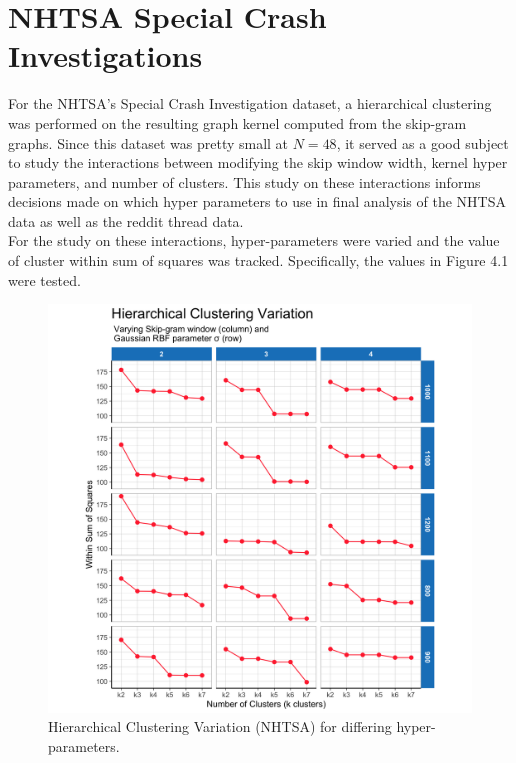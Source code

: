 %
%
%




\section{NHTSA Special Crash Investigations}
 For the NHTSA's Special Crash Investigation dataset, a hierarchical clustering was performed on the resulting graph kernel computed from the skip-gram graphs. Since this dataset was pretty small at $N=48$, it served as a good subject to study the interactions between modifying the skip window width, kernel hyper parameters, and number of clusters. This study on these interactions informs decisions made on which hyper parameters to use in final analysis of the NHTSA data as well as the reddit thread data. \\
 
For the study on these interactions, hyper-parameters were varied and the value of cluster within sum of squares was tracked. Specifically, the values in Figure 4.1 were tested. \\
 

\begin{figure}
\includegraphics[width=6in]{Content/Images/hclust_variation.png}
\caption{Hierarchical Clustering Variation (NHTSA) for differing hyper-parameters.}
\end{figure}

